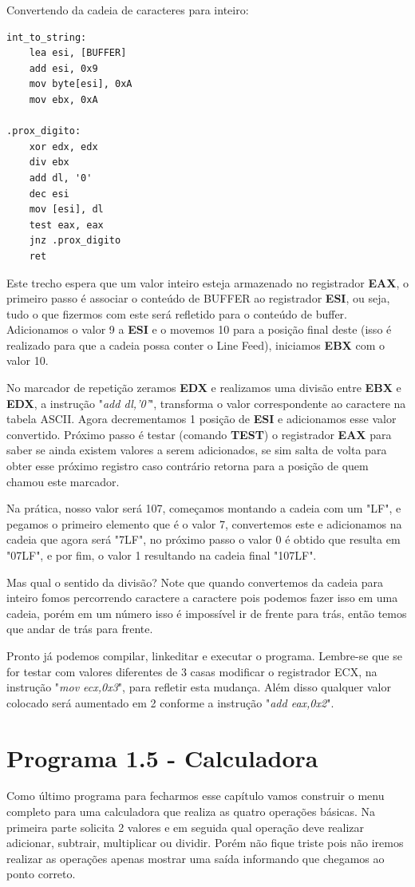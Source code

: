 Convertendo da cadeia de caracteres para inteiro:
\begin{lstlisting}[]
int_to_string:
	lea esi, [BUFFER]
	add esi, 0x9
	mov byte[esi], 0xA
	mov ebx, 0xA

.prox_digito:
	xor edx, edx
	div ebx
	add dl, '0'
	dec esi
	mov [esi], dl
	test eax, eax
	jnz .prox_digito
	ret
\end{lstlisting}

Este trecho espera que um valor inteiro esteja armazenado no registrador \textbf{EAX}, o primeiro passo é associar o conteúdo de BUFFER ao registrador \textbf{ESI}, ou seja, tudo o que fizermos com este será refletido para o conteúdo de buffer. Adicionamos o valor 9 a \textbf{ESI} e o movemos 10 para a posição final deste (isso é realizado para que a cadeia possa conter o Line Feed), iniciamos \textbf{EBX} com o valor 10.

No marcador de repetição zeramos \textbf{EDX} e realizamos uma divisão entre \textbf{EBX} e \textbf{EDX}, a instrução "\textit{add dl,'0'}", transforma o valor correspondente ao caractere na tabela ASCII. Agora decrementamos 1 posição de \textbf{ESI} e adicionamos esse valor convertido. Próximo passo é testar (comando \textbf{TEST}) o registrador \textbf{EAX} para saber se ainda existem valores a serem adicionados, se sim salta de volta para obter esse próximo registro caso contrário retorna para a posição de quem chamou este marcador.

Na prática, nosso valor será 107, começamos montando a cadeia com um "LF", e pegamos o primeiro elemento que é o valor 7, convertemos este e adicionamos na cadeia que agora será "7LF", no próximo passo o valor 0 é obtido que resulta em "07LF", e por fim, o valor 1 resultando na cadeia final "107LF".

Mas qual o sentido da divisão? Note que quando convertemos da cadeia para inteiro fomos percorrendo caractere a caractere pois podemos fazer isso em uma cadeia, porém em um número isso é impossível ir de frente para trás, então temos que andar de trás para frente.

Pronto já podemos compilar, linkeditar e executar o programa. Lembre-se que se for testar com valores diferentes de 3 casas modificar o registrador ECX, na instrução "\textit{mov ecx,0x3}", para refletir esta mudança. Além disso qualquer valor colocado será aumentado em 2 conforme a instrução "\textit{add eax,0x2}".

\section{Programa 1.5 - Calculadora}
Como último programa para fecharmos esse capítulo vamos construir o menu completo para uma calculadora que realiza as quatro operações básicas. Na primeira parte solicita 2 valores e em seguida qual operação deve realizar adicionar, subtrair, multiplicar ou dividir. Porém não fique triste pois não iremos realizar as operações apenas mostrar uma saída informando que chegamos ao ponto correto.


